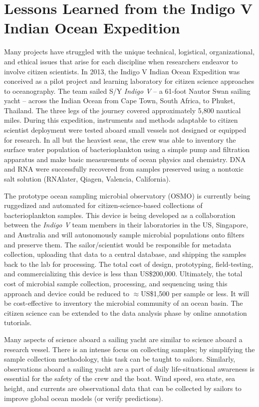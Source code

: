 \section{Lessons Learned from the Indigo V Indian Ocean Expedition}

Many projects have struggled with the unique technical, logistical, organizational, and ethical issues that arise for each discipline when researchers endeavor to involve citizen scientists. In 2013, the Indigo V Indian Ocean Expedition was conceived as a pilot project and learning laboratory for citizen science approaches to oceanography. The team sailed S/Y {\em Indigo V} -- a 61-foot Nautor Swan sailing yacht -- across the Indian Ocean from Cape Town, South Africa, to Phuket, Thailand. The three legs of the journey covered approximately 5,800 nautical miles. During this expedition, instruments and methods adaptable to citizen scientist deployment were tested aboard small vessels not designed or equipped for research. In all but the heaviest seas, the crew was able to inventory the surface water population of bacterioplankton using a simple pump and filtration apparatus and make basic measurements of ocean physics and chemistry. DNA and RNA were successfully recovered from samples preserved using a nontoxic salt solution (RNAlater, Qiagen, Valencia, California).

The prototype ocean sampling microbial observatory (OSMO) is currently being ruggedized and automated for citizen-science-based collections of bacterioplankton samples. This device is being developed as a collaboration between the {\em Indigo V} team members in their laboratories in the US, Singapore, and Australia and will autonomously sample microbial populations onto filters and preserve them. The sailor/scientist would be responsible for metadata collection, uploading that data to a central database, and shipping the samples back to the lab for processing. The total cost of design, prototyping, field-testing, and commercializing this device is less than US\$200,000. Ultimately, the total cost of microbial sample collection, processing, and sequencing using this approach and device could be reduced to $\approx$US\$1,500 per sample or less. It will be cost-effective to inventory the microbial community of an ocean basin. The citizen science can be extended to the data analysis phase by online annotation tutorials.

Many aspects of science aboard a sailing yacht are similar to science aboard a research vessel. There is an intense focus on collecting samples; by simplifying the sample collection methodology, this task can be taught to sailors. Similarly, observations aboard a sailing yacht are a part of daily life-situational awareness is essential for the safety of the crew and the boat. Wind speed, sea state, sea height, and currents are observational data that can be collected by sailors to improve global ocean models (or verify predictions).

